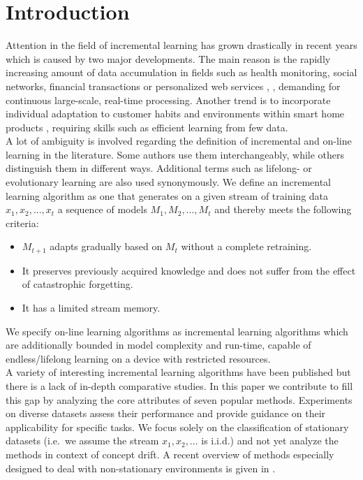 \documentclass{esann}
\begin{document}
\section{Introduction}
Attention in the field of incremental learning has grown drastically in recent years which is caused by two major developments. The main reason is the rapidly increasing amount of data accumulation in fields such as health monitoring,
social networks, financial transactions or personalized web services \cite{ageOfBigData}, \cite{bigDataSurvey}, demanding for continuous large-scale, real-time processing. 
Another trend is to incorporate individual adaptation to customer habits and environments within smart home products \cite{Yang:2013:LLT:2493432.2493489}, \cite{Carolis:2015:ILD:2688469.2675063} requiring
skills such as efficient learning from few data.\\
A lot of ambiguity is involved regarding the definition of incremental and on-line learning in the literature. Some authors use them interchangeably, while others distinguish them in different ways. 
Additional terms such as lifelong- or evolutionary learning are also used synonymously. We define an incremental learning algorithm as one that generates on a given stream of training data $x_1,x_2,...,x_t$ a sequence of models $M_1,M_2,...,M_t$ and thereby meets
the following criteria:
\begin{itemize}[leftmargin=2em, topsep=0.3em, partopsep=0em, parsep=0em, itemsep=0em] 
\item $M_{t+1}$ adapts gradually based on $M_{t}$ without a complete retraining.
\item It preserves previously acquired knowledge and does not suffer from the effect of catastrophic forgetting. %
\item It has a limited stream memory.
\end{itemize}
We specify on-line learning algorithms as incremental learning algorithms which are additionally bounded in model complexity and run-time, capable of endless/lifelong learning on a device with restricted resources.\\
A variety of interesting incremental learning algorithms have been published but there is a lack of in-depth comparative studies. 
In this paper we contribute to fill this gap by analyzing the core attributes of seven popular methods. 
Experiments on diverse datasets assess their performance and provide guidance on their applicability for specific tasks. We focus solely on the classification of stationary datasets (i.e.\ we assume
the stream $x_1,x_2,...$ is i.i.d.) and not yet analyze the methods in context of concept drift. A recent overview of methods especially designed to deal with non-stationary environments is given in \cite{ditzler2015learning}. 
\end{document}
